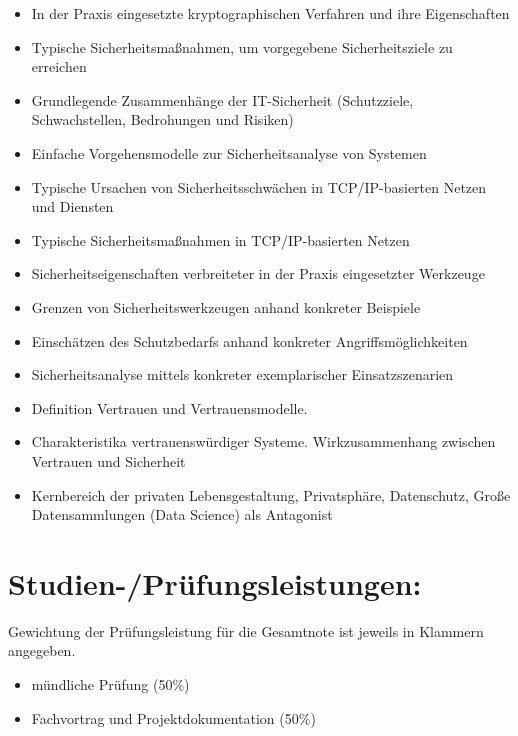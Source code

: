 \begin{itemize}
\tightlist
\item
  In der Praxis eingesetzte kryptographischen Verfahren und ihre
  Eigenschaften
\item
  Typische Sicherheitsmaßnahmen, um vorgegebene Sicherheitsziele zu
  erreichen
\item
  Grundlegende Zusammenhänge der IT-Sicherheit (Schutzziele,
  Schwachstellen, Bedrohungen und Risiken)
\item
  Einfache Vorgehensmodelle zur Sicherheitsanalyse von Systemen
\item
  Typische Ursachen von Sicherheitsschwächen in TCP/IP-basierten Netzen
  und Diensten
\item
  Typische Sicherheitsmaßnahmen in TCP/IP-basierten Netzen
\item
  Sicherheitseigenschaften verbreiteter in der Praxis eingesetzter
  Werkzeuge
\item
  Grenzen von Sicherheitswerkzeugen anhand konkreter Beispiele
\item
  Einschätzen des Schutzbedarfs anhand konkreter Angriffsmöglichkeiten
\item
  Sicherheitsanalyse mittels konkreter exemplarischer Einsatzszenarien
\item
  Definition Vertrauen und Vertrauensmodelle.
\item
  Charakteristika vertrauenswürdiger Systeme. Wirkzusammenhang zwischen
  Vertrauen und Sicherheit
\item
  Kernbereich der privaten Lebensgestaltung, Privatsphäre, Datenschutz,
  Große Datensammlungen (Data Science) als Antagonist
\end{itemize}

\section*{Studien-/Prüfungsleistungen:\label{/mi-2017/modulbeschreibungen-master/MA_WTW_Modul_IT-Sicherheit}}\label{studien-pruxfcfungsleistungenpathlabelmi-2017modulbeschreibungen-mastermaux5fwtwux5fmodulux5fit-sicherheit}

Gewichtung der Prüfungsleistung für die Gesamtnote ist jeweils in
Klammern angegeben.

\begin{itemize}
\tightlist
\item
  mündliche Prüfung (50\%)
\item
  Fachvortrag und Projektdokumentation (50\%)
\end{itemize}

